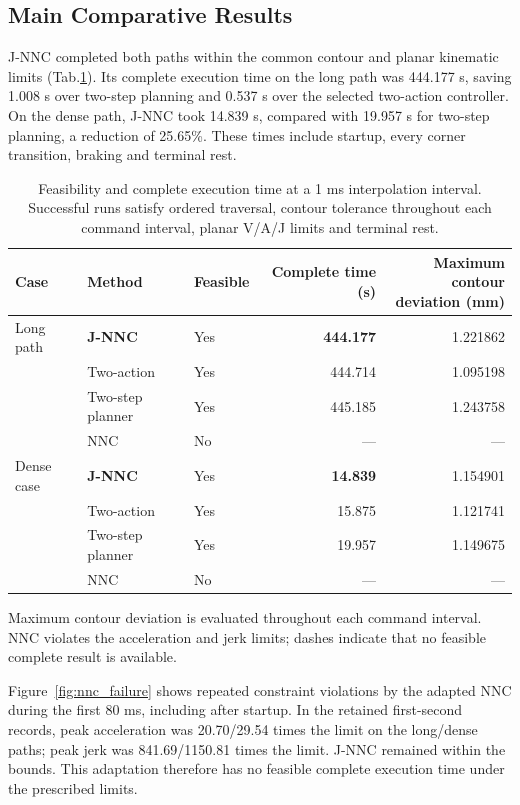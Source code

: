 \documentclass[preprint,12pt,nonatbib]{elsarticle}
\newcommand{\tabref}[1]{Tab.\nobreakspace\ref{#1}}
\begin{document}
\subsection{Main Comparative Results}
J-NNC completed both paths within the common contour and planar kinematic limits (\tabref{tab:main_results}). Its complete execution time on the long path was 444.177 s, saving 1.008 s over two-step planning and 0.537 s over the selected two-action controller. On the dense path, J-NNC took 14.839 s, compared with 19.957 s for two-step planning, a reduction of 25.65\%. These times include startup, every corner transition, braking and terminal rest.

\begin{table}[htbp]
\centering
\caption{Feasibility and complete execution time at a 1 ms interpolation interval. Successful runs satisfy ordered traversal, contour tolerance throughout each command interval, planar V/A/J limits and terminal rest.}
\label{tab:main_results}
\small
\setlength{\tabcolsep}{3.5pt}
\begin{tabular}{lllrr}
\toprule
Case & Method & Feasible & Complete time (s) & \shortstack{Maximum contour\\deviation (mm)}\\
\midrule
Long path & \textbf{J-NNC} & Yes & \textbf{444.177} & 1.221862\\
 & Two-action & Yes & 444.714 & 1.095198\\
 & Two-step planner & Yes & 445.185 & 1.243758\\
 & NNC & No & --- & ---\\
\midrule
Dense case & \textbf{J-NNC} & Yes & \textbf{14.839} & 1.154901\\
 & Two-action & Yes & 15.875 & 1.121741\\
 & Two-step planner & Yes & 19.957 & 1.149675\\
 & NNC & No & --- & ---\\
\bottomrule
\end{tabular}
\par\smallskip
\begin{minipage}{0.98\linewidth}\footnotesize
Maximum contour deviation is evaluated throughout each command interval. NNC violates the acceleration and jerk limits; dashes indicate that no feasible complete result is available.
\end{minipage}
\end{table}

Figure~\ref{fig:nnc_failure} shows repeated constraint violations by the adapted NNC during the first 80 ms, including after startup. In the retained first-second records, peak acceleration was 20.70/29.54 times the limit on the long/dense paths; peak jerk was 841.69/1150.81 times the limit. J-NNC remained within the bounds. This adaptation therefore has no feasible complete execution time under the prescribed limits.
\end{document}
